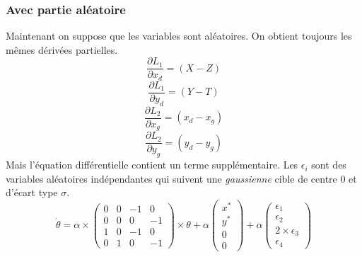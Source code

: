 \documentclass{article}
\begin{document}
\subsubsection{Avec partie aléatoire}
Maintenant on suppose que les variables sont aléatoires. On obtient toujours les mêmes dérivées partielles.
$$ \frac{\partial L_1}{\partial x_d} = (X - Z) $$
$$ \frac{\partial L_1}{\partial y_d} = (Y - T) $$
$$ \frac{\partial L_2}{\partial x_g} = (x_d - x_g) $$
$$ \frac{\partial L_2}{\partial y_g} = (y_d - y_g) $$ 
Mais l'équation différentielle contient un terme supplémentaire. Les $\epsilon_i$ sont des variables aléatoires indépendantes
qui suivent une \textit{gaussienne} cible de centre 0 et d'écart type $\sigma$.
$$ \dot{\theta} = \alpha \times \begin{pmatrix}
0 & 0 & -1 & 0 \\
0 & 0 & 0 & -1 \\
1 & 0 & -1 & 0 \\
0 & 1 & 0 & -1
\end{pmatrix} \times \theta + \alpha \begin{pmatrix}
x^* \\
y^* \\
0 \\
0
\end{pmatrix} + \alpha \begin{pmatrix}
\epsilon_1 \\
\epsilon_2 \\
2 \times \epsilon_3 \\
\epsilon_4
\end{pmatrix} $$
\end{document}
